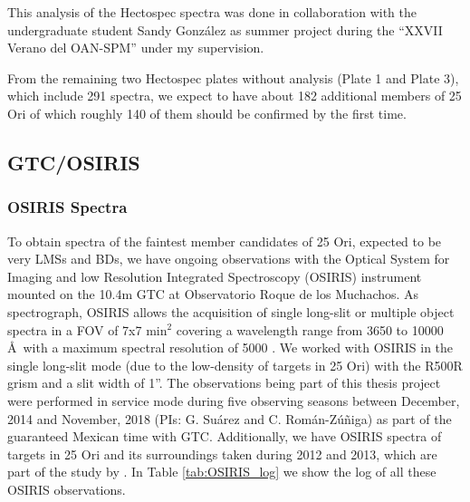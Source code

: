 \documentclass[12pt]{article}
\begin{document}
This analysis of the Hectospec spectra was done in collaboration with the undergraduate student Sandy Gonz\'alez as summer project during the ``XXVII Verano del OAN-SPM'' under my supervision.


From the remaining two Hectospec plates without analysis (Plate 1 and Plate 3), which include 291 spectra, we expect to have about 182 additional members of 25 Ori of which roughly 140 of them should be confirmed by the first time.

\subsection{GTC/OSIRIS}
\label{sec:OSIRIS}

\subsubsection{OSIRIS Spectra}
\label{sec_OSIRIS:spectra}
To obtain spectra of the faintest member candidates of 25 Ori, expected to be very LMSs and BDs, we have ongoing observations with the Optical System for Imaging and low Resolution Integrated Spectroscopy (\ac{OSIRIS}) instrument mounted on the 10.4m GTC at Observatorio Roque de los Muchachos. As spectrograph, OSIRIS allows the acquisition of single long-slit or multiple object spectra in a FOV of 7x7 min$^2$ covering a wavelength range from 3650 to 10000 \AA\ with a maximum spectral resolution of 5000 \citep{Cepa2000,Cepa2003}. We worked with OSIRIS in the single long-slit mode (due to the low-density of targets in 25 Ori) with the R500R grism and a slit width of 1''. The observations being part of this thesis project were performed in service mode during five observing seasons between December, 2014 and November, 2018 (PIs: G. Su\'arez and C. Rom\'an-Z\'u\~niga) as part of the guaranteed Mexican time with GTC. Additionally, we have OSIRIS spectra of targets in 25 Ori and its surroundings taken during 2012 and 2013, which are part of the study by \citet{Downes2015}. In Table \ref{tab:OSIRIS_log} we show the log of all these OSIRIS observations.
\end{document}
